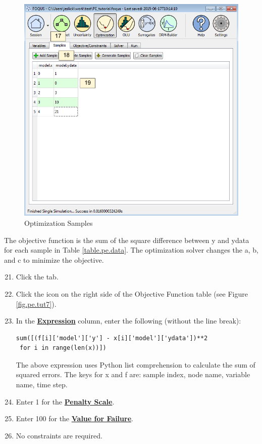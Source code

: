 \begin{figure}[H]
	\begin{center}
		\includegraphics[scale=0.55]{Chapt_optimization/figs/par_est_tut6}
		\caption{Optimization Samples}
		\label{fig.pe.tut6}
	\end{center}
\end{figure}

The objective function is the sum of the square difference between y and ydata for each sample in Table \ref{table.pe.data}. The optimization solver changes the a, b, and c to minimize the objective.

\begin{enumerate}
	\setcounter{enumi}{20}
	\item Click the  tab.
	\item Click the  icon on the right side of the Objective Function table  (see Figure \ref{fig.pe.tut7}).
	\item In the \textbf{\underline{Expression}} column, enter the following (without the line break):
	\begin{small}
	\begin{verbatim}
sum([(f[i]['model']['y'] - x[i]['model']['ydata'])**2
 for i in range(len(x))])
	\end{verbatim}
	\end{small}
	The above expression uses Python list comprehension to calculate the sum of squared errors. The keys for x and f are: sample index, node name, variable name, time step.
	\item Enter 1 for the \textbf{\underline{Penalty Scale}}.
	\item Enter 100 for the \textbf{\underline{Value for Failure}}.
	\item No constraints are required.
\end{enumerate}

